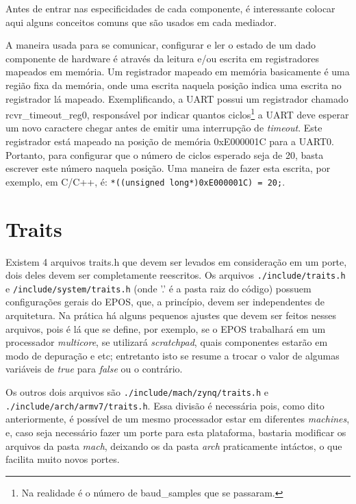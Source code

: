 \documentclass{ufscThesis/ufscThesis} %
\begin{document}
Antes de entrar nas especificidades de cada componente, é interessante colocar aqui alguns conceitos comuns que são usados em cada mediador.

A maneira usada para se comunicar, configurar e ler o estado de um dado componente de hardware é através da leitura e/ou escrita em registradores mapeados em memória. Um registrador mapeado em memória basicamente é uma região fixa da memória, onde uma escrita naquela posição indica uma escrita no registrador lá mapeado.
Exemplificando, a UART possui um registrador chamado rcvr\_timeout\_reg0, responsável por indicar quantos ciclos\footnote{Na realidade é o número de baud\_samples que se passaram.} a UART deve esperar um novo caractere chegar antes de emitir uma interrupção de \emph{timeout}. Este registrador está mapeado na posição de memória 0xE000001C para a UART0. Portanto, para configurar que o número de ciclos esperado seja de 20, basta escrever este número naquela posição. Uma maneira de fazer esta escrita, por exemplo, em C/C++, é: \verb+*((unsigned long*)0xE000001C) = 20;+.



\section{Traits}

Existem 4 arquivos traits.h que devem ser levados em consideração em um porte, dois deles devem ser completamente reescritos. Os arquivos \verb+./include/traits.h+ e \verb+/include/system/traits.h+ (onde '.' é a pasta raiz do código) possuem configurações gerais do EPOS, que, a princípio, devem ser independentes de arquitetura. Na prática há alguns pequenos ajustes que devem ser feitos nesses arquivos, pois é lá que se define, por exemplo, se o EPOS trabalhará em um processador \emph{multicore}, se utilizará \emph{scratchpad}, quais componentes estarão em modo de depuração e etc; entretanto isto se resume a trocar o valor de algumas variáveis de \emph{true} para \emph{false} ou o contrário.

Os outros dois arquivos são \verb+./include/mach/zynq/traits.h+ e \verb+./include/arch/armv7/traits.h+. Essa divisão é necessária pois, como dito anteriormente, é possível de um mesmo processador estar em diferentes \emph{machines}, e, caso seja necessário fazer um porte para esta plataforma, bastaria modificar os arquivos da pasta \emph{mach}, deixando os da pasta \emph{arch} praticamente intáctos, o que facilita muito novos portes.
\end{document}
